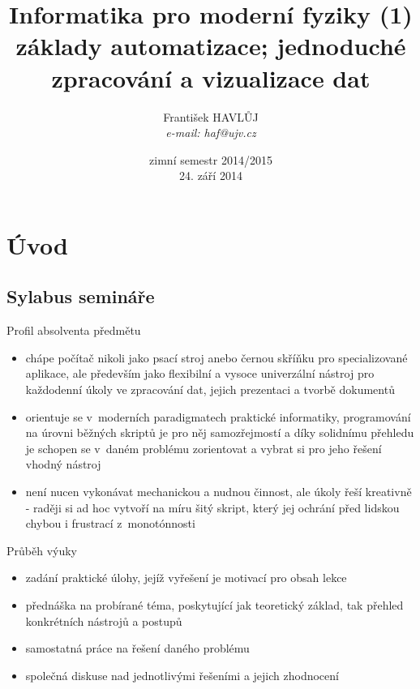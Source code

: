 \documentclass{beamer}
\title[IMF (1)]{Informatika pro moderní fyziky (1)\\základy automatizace; jednoduché zpracování a vizualizace dat}
\author[Franti\v{s}ek HAVL\r{U}J, ORF ÚJV Řež]{Franti\v{s}ek HAVL\r{U}J\\{\scriptsize \emph{e-mail: haf@ujv.cz}}}
\date{zimní semestr 2014/2015\\24. září 2014}
\institute[ORF ÚJV Řež]
{ÚJV Řež\\oddělení Reaktorové fyziky a podpory palivového cyklu}
\begin{document}
\begin{frame}
  \titlepage
\end{frame}

\begin{frame}
  \tableofcontents
\end{frame}

\section{Úvod}

\subsection{Sylabus semináře}

\begin{frame}{Profil absolventa předmětu}
  \begin{itemize}
    \item chápe počítač nikoli jako psací stroj anebo černou skříňku pro specializované aplikace, ale především jako flexibilní a vysoce univerzální nástroj pro každodenní úkoly ve zpracování dat, jejich prezentaci a tvorbě dokumentů
    \item orientuje se v~moderních paradigmatech praktické informatiky, programování na úrovni běžných skriptů je pro něj samozřejmostí a díky solidnímu přehledu je schopen se v~daném problému zorientovat a vybrat si pro jeho řešení vhodný nástroj
    \item není nucen vykonávat mechanickou a nudnou činnost, ale úkoly řeší kreativně - raději si ad hoc vytvoří na míru šitý skript, který jej ochrání před lidskou chybou i frustrací z~monotónnosti
  \end{itemize}
\end{frame}

\begin{frame}{Průběh výuky}
  \begin{itemize}
    \item zadání praktické úlohy, jejíž vyřešení je motivací pro obsah lekce
    \item přednáška na probírané téma, poskytující jak teoretický základ, tak přehled konkrétních nástrojů a postupů
    \item samostatná práce na řešení daného problému
    \item společná diskuse nad jednotlivými řešeními a jejich zhodnocení
  \end{itemize}
\end{frame}
\end{document}
